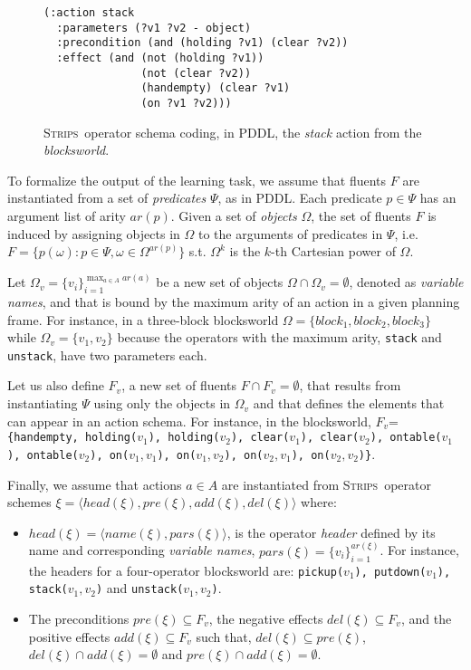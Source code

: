 \documentclass[letterpaper]{article} %
\newcommand{\tup}[1]{{\langle #1 \rangle}}
\newcommand{\strips}{\textsc{Strips}}     %
\begin{document}
\begin{figure}
\begin{footnotesize}
\begin{verbatim}
(:action stack
  :parameters (?v1 ?v2 - object)
  :precondition (and (holding ?v1) (clear ?v2))
  :effect (and (not (holding ?v1))
               (not (clear ?v2))
               (handempty) (clear ?v1)
               (on ?v1 ?v2)))
\end{verbatim}
\end{footnotesize}
 \caption{\small \strips\ operator schema coding, in PDDL, the {\em stack} action from the {\em blocksworld}.}
\label{fig:stack}
\end{figure}

To formalize the output of the learning task, we assume that fluents $F$ are instantiated from a set of {\em predicates} $\Psi$, as in PDDL. Each predicate $p\in\Psi$ has an argument list of arity $ar(p)$. Given a set of {\em objects} $\Omega$, the set of fluents $F$ is induced by assigning objects in $\Omega$ to the arguments of predicates in $\Psi$, i.e.~$F=\{p(\omega):p\in\Psi,\omega\in\Omega^{ar(p)}\}$ s.t. $\Omega^k$ is the $k$-th Cartesian power of $\Omega$. 

Let $\Omega_v=\{v_i\}_{i=1}^{\operatorname*{max}_{a\in A} ar(a)}$ be a new set of objects $\Omega\cap\Omega_v=\emptyset$, denoted as {\em variable names}, and that is bound by the maximum arity of an action in a given planning frame. For instance, in a three-block blocksworld $\Omega=\{block_1, block_2, block_3\}$ while $\Omega_v=\{v_1, v_2\}$ because the operators with the maximum arity, {\small\tt stack} and {\small\tt unstack}, have two parameters each.

Let us also define $F_v$, a new set of fluents $F\cap F_v=\emptyset$, that results from instantiating $\Psi$ using only the objects in $\Omega_v$ and that defines the elements that can appear in an action schema. For instance, in the blocksworld, $F_v$={\small\tt\{handempty, holding($v_1$), holding($v_2$), clear($v_1$), clear($v_2$), ontable($v_1$), ontable($v_2$), on($v_1,v_1$), on($v_1,v_2$), on($v_2,v_1$), on($v_2,v_2$)\}}.

Finally, we assume that actions $a\in A$ are instantiated from \strips\ operator schemes $\xi=\tup{head(\xi),pre(\xi),add(\xi),del(\xi)}$ where:
\begin{itemize}
\item $head(\xi)=\tup{name(\xi),pars(\xi)}$, is the operator {\em header} defined by its name and corresponding {\em variable names}, $pars(\xi)=\{v_i\}_{i=1}^{ar(\xi)}$. For instance, the headers for a four-operator blocksworld are: {\small\tt pickup($v_1$), putdown($v_1$), stack($v_1,v_2$)} and {\small\tt unstack($v_1,v_2$)}.
\item The preconditions $pre(\xi)\subseteq F_v$, the negative effects $del(\xi)\subseteq F_v$, and the positive effects $add(\xi)\subseteq F_v$ such that, $del(\xi)\subseteq pre(\xi)$, $del(\xi)\cap add(\xi)=\emptyset$ and $pre(\xi)\cap add(\xi)=\emptyset$.
\end{itemize}
\end{document}
